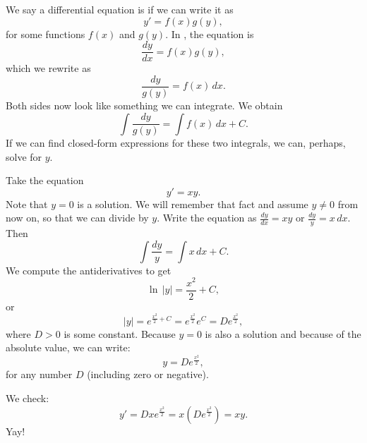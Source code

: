 We say a differential equation is
\emph{}
if we can write it as
\begin{equation*}
y' = f(x)g(y) ,
\end{equation*}
for some functions $f(x)$ and $g(y)$.
In , the equation is
\begin{equation*}
\frac{dy}{dx} = f(x)g(y) ,
\end{equation*}
which we rewrite as
\begin{equation*}
\frac{dy}{g(y)} = f(x) \,dx .
\end{equation*}
Both sides now look like something we can integrate.  We obtain
\begin{equation*}
\int \frac{dy}{g(y)} = \int f(x) \,dx + C .
\end{equation*}
If we can find closed-form expressions
for these two integrals, we can, perhaps, solve for $y$.

\begin{example} \label{example:yprimeisxy}
Take the equation
\begin{equation*}
y' = xy .
\end{equation*}
Note that $y=0$ is a solution.  We will remember that fact and
assume $y \neq 0$ from now on, so that we can divide by $y$.
Write the equation as $\frac{dy}{dx} = xy$ or
$\frac{dy}{y} = x \, dx$.
Then
\begin{equation*}
\int \frac{dy}{y} = \int x\,dx + C .
\end{equation*}
We compute the antiderivatives to get
\begin{equation*}
\ln \, \lvert y\rvert = \frac{x^2}{2} + C ,
\end{equation*}
or
\begin{equation*}
\lvert y \rvert = e^{\frac{x^2}{2} + C} = e^{\frac{x^2}{2}} e^C = D e^{\frac{x^2}{2}} ,
\end{equation*}
where $D > 0$ is some constant.  Because $y=0$ is also a solution and because
of the absolute value, we can write:
\begin{equation*}
y = D e^{\frac{x^2}{2}} ,
\end{equation*}
for any number $D$ (including zero or negative).

We check:
\begin{equation*}
y' = D x e^{\frac{x^2}{2}} = x \left( D e^{\frac{x^2}{2}} \right) = xy .
\end{equation*}
Yay!
\end{example}

